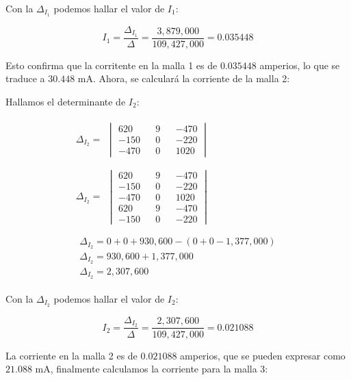 \documentclass[conference]{IEEEtran}
\begin{document}
Con la $\Delta_{I_1}$ podemos hallar el valor de $I_1$:

\begin{equation*}
  I_1 = \frac{\Delta_{I_1}}{\Delta} = \frac{3,879,000}{109,427,000} = 0.035448
\end{equation*}

Esto confirma que la corritente en la malla 1 es de $0.035448$ amperios, lo que se 
traduce a $30.448$ mA. Ahora, se calculará la corriente de la malla 2:

Hallamos el determinante de $I_2$:

\begin{align*}
  \Delta_{I_2} =
  \begin{split}
    \begin{vmatrix}
      620  && 9 && -470 \\
      -150 && 0 && -220 \\
      -470 && 0 && 1020
    \end{vmatrix}
  \end{split} \\ \\
  \Delta_{I_2} =
  \begin{split}
    \begin{vmatrix}
      620  && 9 && -470 \\
      -150 && 0 && -220 \\
      -470 && 0 && 1020 \\
      620  && 9 && -470 \\
      -150 && 0 && -220
    \end{vmatrix}
  \end{split} \\ \\
  \begin{split}
    \Delta_{I_2} = 0 + 0 + 930,600 - (0 + 0 - 1,377,000) \\
    \Delta_{I_2} = 930,600 + 1,377,000 \\
    \Delta_{I_2} = 2,307,600
  \end{split}
\end{align*}

Con la $\Delta_{I_2}$ podemos hallar el valor de $I_2$:

\begin{equation*}
  I_2 = \frac{\Delta_{I_2}}{\Delta} = \frac{2,307,600}{109,427,000} = 0.021088
\end{equation*}

La corriente en la malla 2 es de $0.021088$ amperios, que se pueden expresar como 
$21.088$ mA, finalmente calculamos la corriente para la malla 3:
\end{document}
